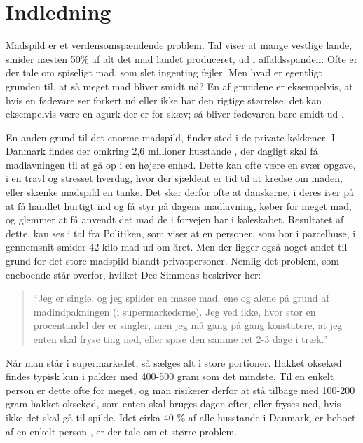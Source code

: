 \section{Indledning}
\label{sec:indledning}

Madspild er et verdensomspændende problem. Tal viser at mange vestlige lande, smider næsten 50\% af alt det mad landet produceret, ud i affaldsspanden. Ofte er der tale om spiseligt mad, som slet ingenting fejler. Men hvad er egentligt grunden til, at så meget mad bliver smidt ud? En af grundene er eksempelvis, at hvis en fødevare ser forkert ud eller ikke har den rigtige størrelse, det kan eksempelvis være en agurk der er for skæv; så bliver fødevaren bare smidt ud \cite{tedmadspild}. 

En anden grund til det enorme madspild, finder sted i de private køkkener. I Danmark findes der omkring 2,6 millioner husstande \cite{husstande}, der dagligt skal få madlavningen til at gå op i en højere enhed. Dette kan ofte være en svær opgave, i en travl og stresset hverdag, hvor der sjældent er tid til at kredse om maden, eller skænke madspild en tanke. Det sker derfor ofte at danskerne, i deres iver på at få handlet hurtigt ind og få styr på dagens madlavning, køber for meget mad, og glemmer at få anvendt det mad de i forvejen har i køleskabet. Resultatet af dette, kan ses i tal fra Politiken, som viser at en personer, som bor i parcelhuse, i gennemsnit smider 42 kilo mad ud om året. \cite{madspildpol} Men der ligger også noget andet til grund for det store madspild blandt privatpersoner. Nemlig det problem, som eneboende står overfor, hvilket Dee Simmons beskriver her: 

\begin{quote}
``Jeg er single, og jeg spilder en masse mad, ene og alene på grund af madindpakningen (i supermarkederne). Jeg ved ikke, hvor stor en procentandel der er singler, men jeg må gang på gang konstatere, at jeg enten skal fryse ting ned, eller spise den samme ret 2-3 dage i træk.'' 
\end{quote}
 
Når man står i supermarkedet, så sælges alt i store portioner. Hakket oksekød findes typisk kun i pakker med 400-500 gram som det mindste. Til en enkelt person er dette ofte for meget, og man risikerer derfor at stå tilbage med 100-200 gram hakket oksekød, som enten skal bruges dagen efter, eller fryses ned, hvis ikke det skal gå til spilde. Idet cirka 40 \% af alle husstande i Danmark, er beboet af en enkelt person \cite{madspild16}, er der tale om et større problem. 

